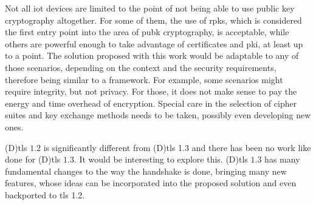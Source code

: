 \documentclass{llncs}
\begin{document}
{Not all \gls{iot} devices are limited to the point of not being able to use
public key cryptography altogether. For some of them, the use of \gls{rpk}s, which is considered the first entry point into the area of \gls{pubk}
cryptography, is acceptable, while others are powerful enough to take
advantage of certificates and \gls{pki}, at least up to a point.
The solution proposed with this work
would be adaptable to any of those scenarios, depending on the context and the security
requirements, therefore being similar to a framework. For example, some scenarios
might require integrity, but not privacy. For those, it does not make sense to
pay the energy and time overhead of encryption. Special care in the
selection of cipher suites and key exchange methods needs to be taken, possibly even developing new ones.

(D)\gls{tls} $1.2$ is significantly different from (D)\gls{tls} 1.3
and there has been no work like \cite{RFC7924} done for (D)\gls{tls} $1.3$.
It would be interesting to explore this. (D)\gls{tls} $1.3$ has many fundamental changes
to the way the handshake is done, bringing many new features, whose ideas can
be incorporated into the proposed solution and even backported to \gls{tls} 1.2.

}
\end{document}
